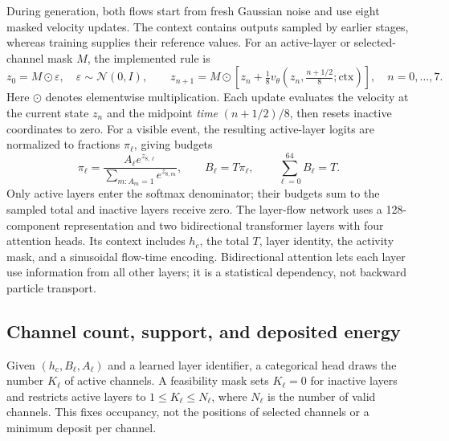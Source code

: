 \documentclass[11pt]{article}
\begin{document}
During generation, both flows start from fresh Gaussian noise and use eight masked velocity updates. The context contains outputs sampled by earlier stages, whereas training supplies their reference values. For an active-layer or selected-channel mask $M$, the implemented rule is
\begin{equation}
 z_0=M\odot\varepsilon,\quad \varepsilon\sim\mathcal N(0,I),\qquad
 z_{n+1}=M\odot\left[z_n+\tfrac18
 v_\theta\!\left(z_n,\tfrac{n+1/2}{8};\mathrm{ctx}\right)\right],
 \quad n=0,\ldots,7.
 \label{eq:flow_steps}
\end{equation}
Here $\odot$ denotes elementwise multiplication. Each update evaluates the velocity at the current state $z_n$ and the midpoint \emph{time} $(n+1/2)/8$, then resets inactive coordinates to zero. For a visible event, the resulting active-layer logits are normalized to fractions $\pi_\ell$, giving budgets
\begin{equation}
 \pi_\ell=\frac{A_\ell e^{z_{8,\ell}}}
 {\sum_{m:A_m=1}e^{z_{8,m}}},\qquad
 B_\ell=T\pi_\ell,\qquad \sum_{\ell=0}^{64}B_\ell=T.
 \label{eq:layer_budget}
\end{equation}
Only active layers enter the softmax denominator; their budgets sum to the sampled total and inactive layers receive zero. The layer-flow network uses a 128-component representation and two bidirectional transformer layers with four attention heads. Its context includes $h_c$, the total $T$, layer identity, the activity mask, and a sinusoidal flow-time encoding. Bidirectional attention lets each layer use information from all other layers; it is a statistical dependency, not backward particle transport.

\subsection{Channel count, support, and deposited energy}

Given $(h_c,B_\ell,A_\ell)$ and a learned layer identifier, a categorical head draws the number $K_\ell$ of active channels. A feasibility mask sets $K_\ell=0$ for inactive layers and restricts active layers to $1\leq K_\ell\leq N_\ell$, where $N_\ell$ is the number of valid channels. This fixes occupancy, not the positions of selected channels or a minimum deposit per channel.
\end{document}
